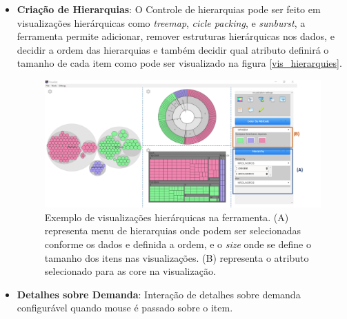 \documentclass[
	12pt,				%
	openright,			%
	oneside,			%
	a4paper,			%
	english,			%
	brazil				%
	]{abntex2}
\begin{document}
\begin{itemize}
\item \textbf{Criação de Hierarquias}:
O Controle de hierarquias pode ser feito em visualizações hierárquicas como \textit{treemap}, \textit{cicle packing}, e \textit{sunburst}, a ferramenta permite adicionar, remover estruturas hierárquicas nos dados, e decidir a ordem das hierarquias e também decidir qual atributo definirá o tamanho de cada item como pode ser visualizado na figura \autoref{vis_hierarquies}. 


\begin{figure}
	\caption{\label{vis_hierarquies}  Exemplo de visualizações hierárquicas na ferramenta. (A) representa menu de hierarquias onde podem ser selecionadas conforme os dados e definida a ordem, e o \textit{size} onde se define o tamanho dos itens nas visualizações. (B) representa o atributo selecionado para as core na visualização.
}
	\begin{center}
	    \includegraphics[width=40pc,scale=1]{figures/hierarquias.png}
	\end{center}
\end{figure}

\item \textbf{Detalhes sobre Demanda}:
Interação de detalhes sobre demanda configurável quando mouse é passado sobre o item.


\end{itemize}
\end{document}
